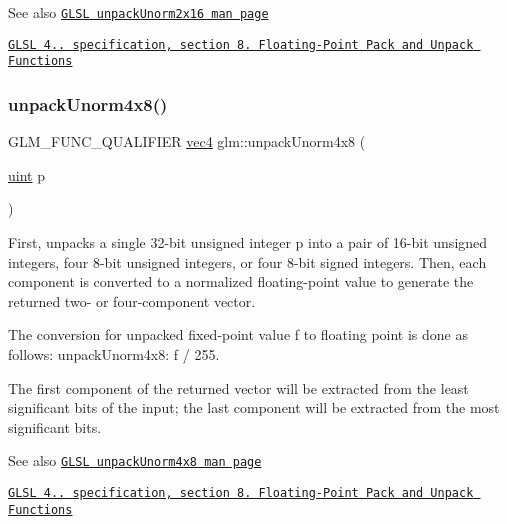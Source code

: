 \begin{DoxySeeAlso}{See also}
\href{http://www.opengl.org/sdk/docs/manglsl/xhtml/unpackUnorm2x16.xml}{\tt G\+L\+SL unpack\+Unorm2x16 man page} 

\href{http://www.opengl.org/registry/doc/GLSLangSpec.4.20.8.pdf}{\tt G\+L\+SL 4.. specification, section 8. Floating-\/\+Point Pack and Unpack Functions} 
\end{DoxySeeAlso}
\mbox{\label{group__core__func__packing_ga1ec646af4b27982d175672bddd642792}} 
\subsubsection{\texorpdfstring{unpack\+Unorm4x8()}{unpackUnorm4x8()}}
{\footnotesize\ttfamily G\+L\+M\+\_\+\+F\+U\+N\+C\+\_\+\+Q\+U\+A\+L\+I\+F\+I\+ER \hyperlink{group__core__types_ga5881b1b022d7fd1b7218f5916532dd02}{vec4} glm\+::unpack\+Unorm4x8 (\begin{DoxyParamCaption}\item[{\hyperlink{group__core__precision_ga4fd29415871152bfb5abd588334147c8}{uint}}]{p }\end{DoxyParamCaption})}

First, unpacks a single 32-\/bit unsigned integer p into a pair of 16-\/bit unsigned integers, four 8-\/bit unsigned integers, or four 8-\/bit signed integers. Then, each component is converted to a normalized floating-\/point value to generate the returned two-\/ or four-\/component vector.

The conversion for unpacked fixed-\/point value f to floating point is done as follows\+: unpack\+Unorm4x8\+: f / 255.

The first component of the returned vector will be extracted from the least significant bits of the input; the last component will be extracted from the most significant bits.

\begin{DoxySeeAlso}{See also}
\href{http://www.opengl.org/sdk/docs/manglsl/xhtml/unpackUnorm4x8.xml}{\tt G\+L\+SL unpack\+Unorm4x8 man page} 

\href{http://www.opengl.org/registry/doc/GLSLangSpec.4.20.8.pdf}{\tt G\+L\+SL 4.. specification, section 8. Floating-\/\+Point Pack and Unpack Functions} 
\end{DoxySeeAlso}
